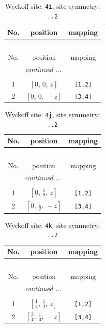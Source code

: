 \documentclass[fleqn,8pt]{jsarticle}
\begin{document}
\renewcommand{\arraystretch}{1.2}
\begin{longtable}{ccc}
\caption{Wyckoff site: {\tt 4i}, site symmetry: {\tt ..2}}
 \\
 \hline \hline
No. & position & mapping \\ \hline \endfirsthead

\multicolumn{2}{l}{\tablename\ \thetable{}} \\
 \hline \hline
No. & position & mapping \\ \hline \endhead

 \hline \hline
\multicolumn{2}{r}{\footnotesize\it continued ...} \\ \endfoot

 \hline \hline
\multicolumn{2}{r}{} \\ \endlastfoot

1 & $\left[ 0,\, 0,\, z \right]$ & {\tt [1,2]} \\ \hline
2 & $\left[ 0,\, 0,\, - z \right]$ & {\tt [3,4]} \\
\end{longtable}
\renewcommand{\arraystretch}{1.2}
\begin{longtable}{ccc}
\caption{Wyckoff site: {\tt 4j}, site symmetry: {\tt ..2}}
 \\
 \hline \hline
No. & position & mapping \\ \hline \endfirsthead

\multicolumn{2}{l}{\tablename\ \thetable{}} \\
 \hline \hline
No. & position & mapping \\ \hline \endhead

 \hline \hline
\multicolumn{2}{r}{\footnotesize\it continued ...} \\ \endfoot

 \hline \hline
\multicolumn{2}{r}{} \\ \endlastfoot

1 & $\left[ 0,\, \frac{1}{2},\, z \right]$ & {\tt [1,2]} \\ \hline
2 & $\left[ 0,\, \frac{1}{2},\, - z \right]$ & {\tt [3,4]} \\
\end{longtable}
\renewcommand{\arraystretch}{1.2}
\begin{longtable}{ccc}
\caption{Wyckoff site: {\tt 4k}, site symmetry: {\tt ..2}}
 \\
 \hline \hline
No. & position & mapping \\ \hline \endfirsthead

\multicolumn{2}{l}{\tablename\ \thetable{}} \\
 \hline \hline
No. & position & mapping \\ \hline \endhead

 \hline \hline
\multicolumn{2}{r}{\footnotesize\it continued ...} \\ \endfoot

 \hline \hline
\multicolumn{2}{r}{} \\ \endlastfoot

1 & $\left[ \frac{1}{4},\, \frac{1}{4},\, z \right]$ & {\tt [1,2]} \\ \hline
2 & $\left[ \frac{3}{4},\, \frac{1}{4},\, - z \right]$ & {\tt [3,4]} \\
\end{longtable}
\end{document}

